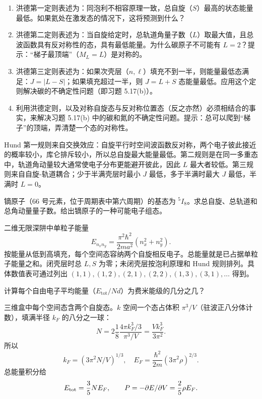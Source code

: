 \begin{question}
\begin{enumerate}
\item 洪德第一定则表述为：同泡利不相容原理一致，总自旋（$S$）最高的状态能量最低。如果氦处在激发态的情况下，这将预测到什么？
\item 洪德第二定则表述为：当自旋给定时，总轨道角量子数（$L$）取最大值，且总波函数具有反对称性的态，具有最低能量。为什么碳原子不可能有 $L=2$？提示：“梯子最顶端”（$M_L=L$）是对称的。
\item 洪德第三定则表述为：如果次壳层（$n,\ell$）填充不到一半，则能量最低态满足：$J=|L-S|$；如果填充超过一半，则 $J=L+S$ 态能量最低。应用这个定则解决碳的不确定性问题（即习题 5.17(b)）。
\item 利用洪德定则，以及对称自旋态与反对称位置态（反之亦然）必须相结合的事实，来解决习题 5.17(b) 中的碳和氮的不确定性问题。提示：总可以爬到“梯子”的顶端，弄清楚一个态的对称性。
\end{enumerate}
\end{question}
\begin{solution}

Hund 第一规则来自交换效应：自旋平行时空间波函数反对称，两个电子彼此接近的概率较小，库仑排斥较小，所以总自旋最大能量最低。第二规则是在同一多重态中，轨道角动量较大通常使电子分布更能避开彼此，因此 $L$ 最大者较低。第三规则来自自旋-轨道耦合；少于半满壳层时最小 $J$ 最低，多于半满时最大 $J$ 最低，半满时 $L=0$。

\end{solution}

\begin{question}
镝原子（66 号元素，位于周期表中第六周期）的基态为 ${}^{5}I_{8}$。求总自旋、总轨道和总角动量量子数。给出镝原子的一种可能电子组态。
\end{question}
\begin{solution}

二维无限深阱中单粒子能量
\[
E_{n_xn_y}=\frac{\pi^2\hbar^2}{2ma^2}(n_x^2+n_y^2).
\]
按能量从低到高填充，每个空间态容纳两个自旋相反电子。总能量就是已占据单粒子能量之和。闭壳层时总 $L,S$ 为零；未闭壳层按泡利原理和 Hund 规则排列。具体数值表可通过列出 $(1,1),(1,2),(2,1),(2,2),(1,3),(3,1),\ldots$ 得到。

\end{solution}

\begin{question}
计算每个自由电子平均能量（$E_{\mathrm{tot}}/Nd$）为费米能级的几分之几？
\end{question}
\begin{solution}

三维盒中每个空间态含两个自旋态。$k$ 空间一个态占体积 $\pi^3/V$（驻波正八分体计数），填满半径 $k_F$ 的八分之一球：
\[
N=2\frac{1}{8}\frac{4\pi k_F^3/3}{\pi^3/V}=\frac{Vk_F^3}{3\pi^2}.
\]
所以
\[
k_F=(3\pi^2N/V)^{1/3},
\quad
E_F=\frac{\hbar^2}{2m}(3\pi^2\rho)^{2/3}.
\]
总能量积分给
\[
E_{\rm tot}=\frac35NE_F,
\qquad
P=-\partial E/\partial V=\frac25\rho E_F.
\]

\end{solution}

